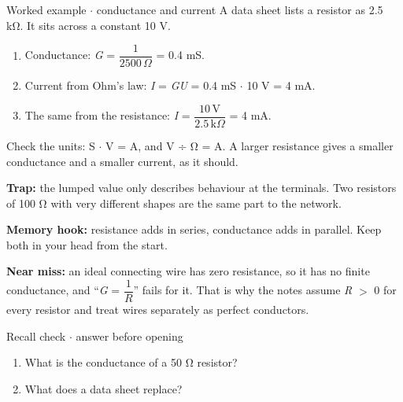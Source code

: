 \documentclass[11pt]{article}
\begin{document}
\begin{keepsection}
\begin{workedbox}{Worked example \ensuremath{\cdot} conductance and current}
A data sheet lists a resistor as 2.5 kΩ. It sits across a constant 10 V.

\begin{enumerate}
\item Conductance: \textit{G} = {\small\ensuremath{\dfrac{1}{2500\, Ω}}} = 0.4 mS.
\item Current from Ohm’s law: \textit{I} = \textit{G}\textit{U} = 0.4 mS \ensuremath{\cdot} 10 V = 4 mA.
\item The same from the resistance: \textit{I} = {\small\ensuremath{\dfrac{10\, \mathrm{V}}{2.5\, \mathrm{k}Ω}}} = 4 mA.
\end{enumerate}

Check the units: S \ensuremath{\cdot} V = A, and V ÷ Ω = A. A larger resistance gives a smaller conductance and a smaller current, as it should.
\end{workedbox}

\begin{notebox}\textbf{Trap:} the lumped value only describes behaviour at the terminals. Two resistors of 100 Ω with very different shapes are the same part to the network.\end{notebox}

\begin{notebox}\textbf{Memory hook:} resistance adds in series, conductance adds in parallel. Keep both in your head from the start.\end{notebox}

\begin{notebox}\textbf{Near miss:} an ideal connecting wire has zero resistance, so it has no finite conductance, and “\textit{G} = {\small\ensuremath{\dfrac{1}{{R}}}}” fails for it. That is why the notes assume \textit{R} \ensuremath{>} 0 for every resistor and treat wires separately as perfect conductors.\end{notebox}

\begin{recallbox}{Recall check \ensuremath{\cdot} answer before opening}
\begin{enumerate}
\item What is the conductance of a 50 Ω resistor?
\item What does a data sheet replace?
\end{enumerate}

\end{recallbox}
\end{keepsection}
\end{document}
